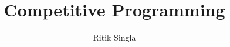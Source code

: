 \documentclass[12pt, a4paper, twoside]{article}
\title{Competitive Programming}
\author{Ritik Singla}
\begin{document}
\twocolumn
\date{} %
\maketitle


\renewcommand{\contentsname}{Index}
\tableofcontents
\end{document}
